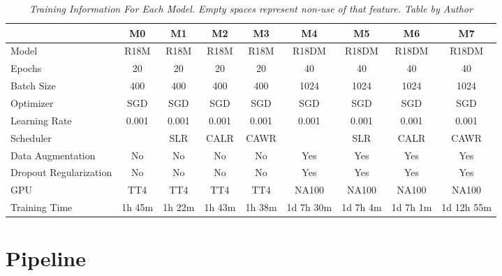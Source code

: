 \begin{landscape}

\begin{table}
\centering
\begin{tabular}{lcccccccc}
    \toprule
 & M0 & M1 & M2 & M3 & M4 & M5 & M6 & M7 \\
 \midrule
 Model & R18M & R18M & R18M & R18M & R18DM & R18DM & R18DM & R18DM \\
Epochs & 20 & 20 & 20 & 20 & 40 & 40 & 40 & 40 \\
Batch Size & 400 & 400 & 400 & 400 & 1024 & 1024 & 1024 & 1024 \\
Optimizer & SGD & SGD & SGD & SGD & SGD & SGD & SGD & SGD \\
Learning Rate & 0.001 & 0.001 & 0.001 & 0.001 & 0.001 & 0.001 & 0.001 & 0.001 \\
Scheduler & & SLR & CALR & CAWR &  & SLR & CALR & CAWR  \\
Data Augmentation & No & No & No & No  & Yes & Yes & Yes & Yes \\
Dropout Regularization & No & No & No & No  & Yes & Yes & Yes & Yes \\
GPU & TT4 & TT4 & TT4 & TT4 & NA100 & NA100 & NA100 & NA100 \\
Training Time & 1h 45m & 1h 22m & 1h 43m & 1h 38m & 1d 7h 30m & 1d 7h 4m & 1d 7h 1m & 1d 12h 55m \\ \bottomrule
\end{tabular}
\caption[Training Information For Each Model.]
  {\textit{Training Information For Each Model. Empty spaces represent non-use of that feature.
  Table by Author}}
{\label{table:trained-models-information}}
\end{table}
\end{landscape}


\newpage

\section{Pipeline}

